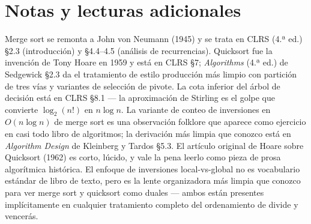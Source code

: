 \documentclass[11pt,a4paper]{article}
\begin{document}
\section{Notas y lecturas adicionales}

Merge sort se remonta a John von Neumann (1945) y se trata en CLRS (4.ª ed.) \S 2.3 (introducción) y \S 4.4--4.5 (análisis de recurrencias). Quicksort fue la invención de Tony Hoare en 1959 y está en CLRS \S 7; \emph{Algorithms} (4.ª ed.) de Sedgewick \S 2.3 da el tratamiento de estilo producción más limpio con partición de tres vías y variantes de selección de pivote. La cota inferior del árbol de decisión está en CLRS \S 8.1 --- la aproximación de Stirling es el golpe que convierte $\log_2(n!)$ en $n \log n$. La variante de conteo de inversiones en $O(n \log n)$ de merge sort es una observación folklore que aparece como ejercicio en casi todo libro de algoritmos; la derivación más limpia que conozco está en \emph{Algorithm Design} de Kleinberg y Tardos \S 5.3. El artículo original de Hoare sobre Quicksort (1962) es corto, lúcido, y vale la pena leerlo como pieza de prosa algorítmica histórica. El enfoque de inversiones local-vs-global no es vocabulario estándar de libro de texto, pero es la lente organizadora más limpia que conozco para ver merge sort y quicksort como duales --- ambos están presentes implícitamente en cualquier tratamiento completo del ordenamiento de divide y vencerás.
\end{document}

